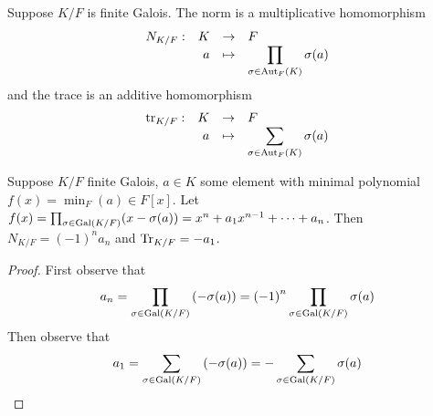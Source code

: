 \begin{definition}
    Suppose \(K/F\) is finite Galois.
    The norm is a multiplicative homomorphism
    \[\begin{array}{rrcl} {N_{K/F}}: & {K} &\to & {F} \\ & {a} &\mapsto & {\displaystyle\prod_{\sigma\in\operatorname{Aut}_F(K)} \sigma(a)} \end{array}\]
    and the trace is an additive homomorphism
    \[\begin{array}{rrcl} {\tr_{K/F}}: & {K} &\to & {F} \\ & {a} &\mapsto & {\displaystyle\sum_{\sigma\in\operatorname{Aut}_F(K)} \sigma(a)} \end{array}\]
\end{definition}
\begin{proposition}
    Suppose \(K/F\) finite Galois,
    \(a \in K\) some element with minimal polynomial \(f(x) = \min_F(a) \in F[x]\).
    Let \(f(x) = \prod_{\sigma\in\operatorname{Gal}(K/F)} (x-\sigma(a)) = x^n + a_1 x^{n-1} + \cdots + a_n\).
    Then \(N_{K/F} = {(-1)}^n a_n\)  and \(\Tr_{K/F} = -a_1\).
\end{proposition}
\begin{proof}
    First observe that
    \begin{equation*}
        a_n = \prod_{\sigma\in\Gal(K/F)} \pqty{-\sigma(a)} = {(-1)}^n \prod_{\sigma\in\Gal(K/F)} \sigma(a)
    \end{equation*}
    Then observe that
    \begin{equation*}
        a_1 = \sum_{\sigma\in\Gal(K/F)} \pqty{-\sigma(a)} = - \sum_{\sigma\in\Gal(K/F)} \sigma(a)
    \end{equation*}
\end{proof}

